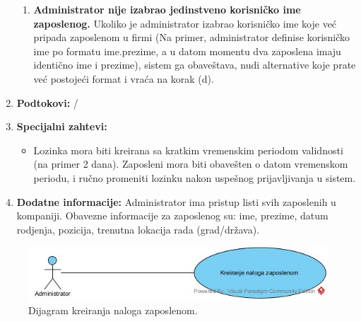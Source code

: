\documentclass[a4paper]{article}
\begin{document}
\begin{enumerate}
\begin{enumerate}
            \item \textbf{Administrator nije izabrao jedinstveno korisničko ime zaposlenog.} Ukoliko je administrator izabrao korisničko ime koje već pripada zaposlenom u firmi (Na primer, administrator definise korisničko ime po formatu ime.prezime, a u datom momentu dva zaposlena imaju identično ime i prezime), sistem ga obaveštava, nudi alternative koje prate već postojeći format i vraća na korak (d).
        \end{enumerate}
    \item \textbf{Podtokovi:} /
    \item \textbf{Specijalni zahtevi:}
        \begin{itemize}
            \item Lozinka mora biti kreirana sa kratkim vremenskim periodom validnosti (na primer 2 dana). Zaposleni mora biti obavešten o datom vremenskom periodu, i ručno promeniti lozinku nakon uspešnog prijavljivanja u sistem.
        \end{itemize}
    \item \textbf{Dodatne informacije:} Administrator ima pristup listi svih zaposlenih u kompaniji. Obavezne informacije za zaposlenog su: ime, prezime, datum rodjenja, pozicija, trenutna lokacija rada (grad/država).
\end{enumerate}

\begin{figure} [!ht]
    \begin{center}
        \includegraphics[scale=0.5]{Korisnici/Administrator/UML/SlucajUpotrebe_KreiranjeNalogaZaposlenom.jpg}
    \end{center}
\caption{Dijagram kreiranja naloga zaposlenom.}
\end{figure}
\end{document}
